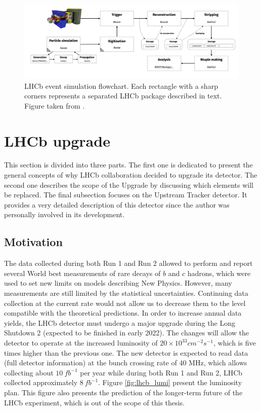 \begin{figure}[!h]
\centering
\includegraphics[angle =-90]{figures/LHCb_simulation.PNG}
\caption{LHCb event simulation flowchart. Each rectangle with a sharp corners represents a separated LHCb package described in text. Figure taken from  \cite{lhcb_computing}.
\label{fig:lhcb_sim}}
\end{figure}



\section{LHCb upgrade}
This section is divided into three parts. The first one is dedicated to present the general concepts of why LHCb collaboration decided to upgrade its detector. The second one describes the scope of the Upgrade by discussing which elements will be replaced. The final subsection focuses on the Upstream Tracker detector. It provides a very detailed description of this detector since the author was personally involved in its development.  

\subsection{Motivation}

The data collected during both Run 1 and Run 2 allowed to perform and report several World best measurements of rare decays of $b$ and $c$ hadrons, which were used to set new limits on models describing New Physics. However, many measurements are still limited by the statistical uncertainties. Continuing data collection at the current rate would not allow us to decrease them to the level compatible with the theoretical predictions. In order to increase annual data yields, the LHCb detector must undergo a major upgrade during the Long Shutdown 2 (expected to be finished in early 2022).  The changes will allow the detector to operate at the increased luminosity of $20 \times 10^{33} cm^{-2}s^{-1}$, which is five times higher than the previous one. The new detector is expected to read data (full detector information) at the bunch crossing rate of 40 MHz, which allows collecting about $10~ fb^{-1}$ per year while during both Run 1 and Run 2, LHCb collected approximately $8~ fb^{-1}$. Figure \ref{fig:lhcb_lumi} present the luminosity plan. This figure also presents the prediction of the longer-term future of the LHCb experiment, which is out of the scope of this thesis.  

